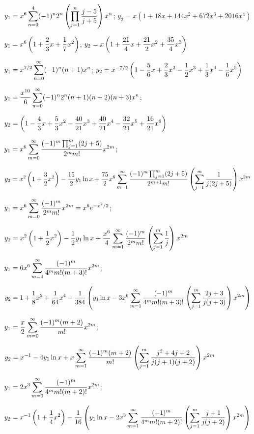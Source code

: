 $y_{1}=\displaystyle{x^{6}\sum_{n=0}^{4}(-1)^{n}2^{n}\left(\prod_{j=1}^{n}\frac{j-5}{j+5}\right)x^{n}}$;\;
$y_{2}=x(1+18x+144x^{2}+672x^{3}+2016x^{4})$

$y_{1}=\displaystyle{x^{6}\left(1+\frac{2}{3}x+\frac{1}{7}x^{2}\right)}$;\;
$y_{2}=\displaystyle{x\left(1+\frac{21}{4}x+\frac{21}{2}x^{2}+\frac{35}{4}x^{3}\right)}$

$y_{1}=\displaystyle{x^{7/2}\sum_{n=0}^{\infty}(-1)^{n}(n+1)x^{n}}$;\;
$y_{2}=x^{-7/2}
\displaystyle\left(1-\frac{5}{6}x+\frac{2}{3}x^{2}-
\frac{1}{2}x^{3}+\frac{1}{3}x^{4}-\frac{1}{6}x^{5}\right)$

$y_{1}=\displaystyle{\frac{x^{10}}{6}\sum_{n=0}^{\infty}(-1)^{n}2^{n}(n+1)(n+2)(n+3)x^{n}}$;\;

$y_{2}=\displaystyle\left(1-\frac{4}{3}x+\frac{5}{3}x^{2}-\frac{40}{21}x^{3}
+\frac{40}{21}x^{4}-\frac{32}{21}x^{5}+\frac{16}{21}x^{6}\right)$

$\displaystyle{y_{1}=x^{6}\sum_{m=0}^{\infty}\frac{(-1)^{m}\prod_{j=1}^{m}(2j+5)}{2^{m}m!}x^{2m}}$;\;

\quad\;  \;
$\displaystyle{y_{2}=x^{2}\left(1+\frac{3}{2}x^{2}\right)-\frac{15}{2}y_{1}\ln x+
\frac{75}{2}x^{6}\sum_{m=1}^{\infty}
\frac{(-1)^{m}\prod_{j=1}^{m}(2j+5)}{2^{m+1}m!}
\left(\sum_{j=1}^{m}\frac{1}{j(2j+5)}\right)x^{2m}}$

$\displaystyle{y_{1}=x^{6}\sum_{m=0}^{\infty}\frac{(-1)^{m}}{2^{m}m!}x^{2m}=x^{6}e^{-x^{2}/2}}$;\;

\quad\;  \;
$\displaystyle{y_{2}=x^{2}\left(1+\frac{1}{2}x^{2}\right)-\frac{1}{2}y_{1}\ln
x+\frac{x^{6}}{4}\sum_{m=1}^{\infty}\frac{(-1)^{m}}{2^{m}m!}\left(\sum_{j=1}^{m}\frac{1}{j}\right)x^{2m}}$

$\displaystyle{y_{1}=6x^{6}\sum_{m=0}^{\infty}\frac{(-1)^{m}}{4^{m}m!(m+3)!}x^{2m}}$;\;

$\displaystyle{y_{2}=1+\frac{1}{8}x^{2}+\frac{1}{64}x^{4}-\frac{1}{384}\left(
y_{1}\ln x-3x^{6}\sum_{m=1}^{\infty}\frac{(-1)^{m}}{4^{m}m!(m+3)!}
\left(\sum_{j=1}^{m}\frac{2j+3}{j(j+3)}\right)x^{2m}\right)}$

$\displaystyle{y_{1}=\frac{x}{2}\sum_{m=0}^{\infty}\frac{(-1)^{m}(m+2)}{m!}x^{2m}}$;\;

\quad\;  \;
$\displaystyle{y_{2}=x^{-1}-4y_{1}\ln x+x\sum_{m=1}^{\infty}\frac{(-1)^{m}(m+2)}{m!}\left(\sum_{j=1}^{m}\frac{j^{2}+4j+2}{j(j+1)(j+2)}\right)x^{2m}}$

$\displaystyle{y_{1}=2x^{3}\sum_{m=0}^{\infty}\frac{(-1)^{m}}{4^{m}m!(m+2)!}x^{2m}}$;\;

\quad\;  \;
$\displaystyle{y_{2}=x^{-1}\left(1+\frac{1}{4}x^{2}\right)-\frac{1}{16}\left(
y_{1}\ln
x-2x^{3}\sum_{m=1}^{\infty}\frac{(-1)^{m}}{4^{m}m!(m+2)!}
\left(\sum_{j=1}^{m}\frac{j+1}{j(j+2)}\right)x^{2m}\right)}$

